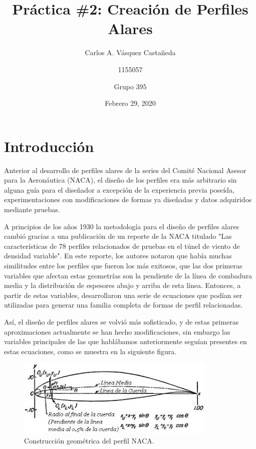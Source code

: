 \documentclass[12pt, letterpaper]{article}
\title{Práctica \#2: Creación de Perfiles Alares}
\author{Carlos A. Vásquez Castañeda \and 1155057 \and Grupo 395}
\date{Febrero 29, 2020}
\begin{document}
\maketitle

\section*{Introducción}
Anterior al desarrollo de perfiles alares de la series del Comité Nacional Asesor para la Aeronáutica (NACA), el diseño de los perfiles era más arbitrario sin alguna guía para el diseñador a excepción de la experiencia previa poseída, experimentaciones con modificaciones de formas ya diseñadas y datos adquiridos mediante pruebas.

A principios de los años 1930 la metodología para el diseño de perfiles alares cambió gracias a una publicación de un reporte de la NACA titulado "Las características de 78 perfiles relacionados de pruebas en el túnel de viento de densidad variable". En este reporte, los autores notaron que había muchas similitudes entre los perfiles que fueron los más exitosos, que las dos primeras variables que afectan estas geometrías son la pendiente de la línea de combadura media y la distribución de espesores abajo y arriba de esta línea. Entonces, a partir de estas variables, desarrollaron una serie de ecuaciones que podían ser utilizadas para generar una familia completa de formas de perfil relacionadas.

Así, el diseño de perfiles alares se volvió más sofisticado, y de estas primeras aproximaciones actualmente se han hecho modificaciones, sin embargo las variables principales de las que hablábamos anteriormente seguían presentes en estas ecuaciones, como se muestra en la siguiente figura.

\begin{figure}[H]
	\centering
	\includegraphics[width=\textwidth]{ay.jpeg}
	\caption{Construcción geométrica del perfil NACA.}
\end{figure}
\end{document}
